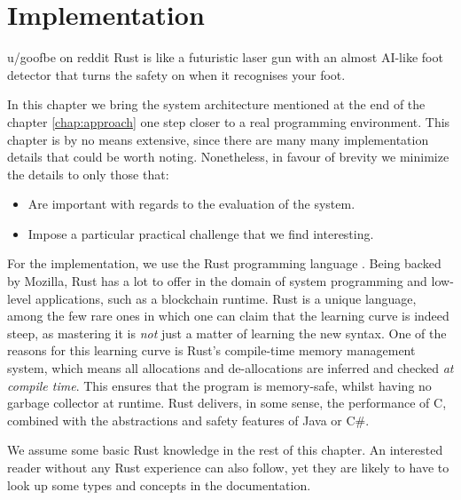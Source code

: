 \chapter{Implementation} \label{chap:impl}

\begin{chapquote}{u/goofbe on reddit}
	Rust is like a futuristic laser gun with an almost AI-like foot detector that turns the safety
	on when it recognises your foot.
\end{chapquote}

In this chapter we bring the system architecture mentioned at the end of the chapter
\ref{chap:approach} one step closer to a real programming environment. This chapter is by no means
extensive, since there are many many implementation details that could be worth noting. Nonetheless,
in favour of brevity we minimize the details to only those that:

\begin{itemize}
	\item Are important with regards to the evaluation of the system.
	\item Impose a particular practical challenge that we find interesting.
\end{itemize}

For the implementation, we use the Rust programming language
\cite{klabnikRustProgrammingLanguage2019}. Being backed by Mozilla, Rust has a lot to offer in the
domain of system programming and low-level applications, such as a blockchain runtime. Rust is a
unique language, among the few rare ones in which one can claim that the learning curve is indeed
steep, as mastering it is \textit{not} just a matter of learning the new syntax. One of the reasons for this
learning curve is Rust's compile-time memory management system, which means all allocations and
de-allocations are inferred and checked \textit{at compile time}. This ensures that the program is
memory-safe, whilst having no garbage collector at runtime. Rust delivers, in some sense, the performance
of C, combined with the abstractions and safety features of Java or
C\#\cite{jungRustBeltSecuringFoundations2017}.

\begin{remark}
	We assume some basic Rust knowledge in the rest of this chapter. An interested reader without
	any Rust experience can also follow, yet they are likely to have to look up some types and
	concepts in the documentation.
\end{remark}

